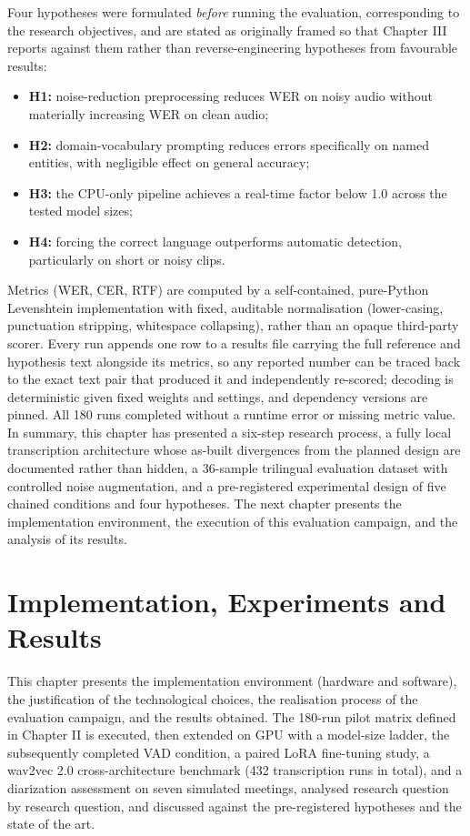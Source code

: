 \documentclass[12pt]{report}
\begin{document}
Four hypotheses were formulated \emph{before} running the evaluation, corresponding to the research objectives, and are stated as originally framed so that Chapter III reports against them rather than reverse-engineering hypotheses from favourable results:
\begin{itemize}
    \item \textbf{H1:} noise-reduction preprocessing reduces WER on noisy audio without materially increasing WER on clean audio;
    \item \textbf{H2:} domain-vocabulary prompting reduces errors specifically on named entities, with negligible effect on general accuracy;
    \item \textbf{H3:} the CPU-only pipeline achieves a real-time factor below 1.0 across the tested model sizes;
    \item \textbf{H4:} forcing the correct language outperforms automatic detection, particularly on short or noisy clips.
\end{itemize}
Metrics (WER, CER, RTF) are computed by a self-contained, pure-Python Levenshtein implementation with fixed, auditable normalisation (lower-casing, punctuation stripping, whitespace collapsing), rather than an opaque third-party scorer. Every run appends one row to a results file carrying the full reference and hypothesis text alongside its metrics, so any reported number can be traced back to the exact text pair that produced it and independently re-scored; decoding is deterministic given fixed weights and settings, and dependency versions are pinned. All 180 runs completed without a runtime error or missing metric value.
\vspace{0.5em}
In summary, this chapter has presented a six-step research process, a fully local transcription architecture whose as-built divergences from the planned design are documented rather than hidden, a 36-sample trilingual evaluation dataset with controlled noise augmentation, and a pre-registered experimental design of five chained conditions and four hypotheses. The next chapter presents the implementation environment, the execution of this evaluation campaign, and the analysis of its results.
\chapter{Implementation, Experiments and Results}
This chapter presents the implementation environment (hardware and software), the justification of the technological choices, the realisation process of the evaluation campaign, and the results obtained. The 180-run pilot matrix defined in Chapter II is executed, then extended on GPU with a model-size ladder, the subsequently completed VAD condition, a paired LoRA fine-tuning study, a wav2vec 2.0 cross-architecture benchmark (432 transcription runs in total), and a diarization assessment on seven simulated meetings, analysed research question by research question, and discussed against the pre-registered hypotheses and the state of the art.
\end{document}
